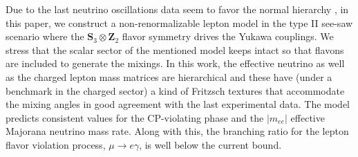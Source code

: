 \documentclass[aps,prd,groupaddress,floatfix,tighten,nofootinbib,showpacs,amsfonts,superscriptaddress]{revtex4-2}
\begin{document}
Due to the last neutrino oscillations data seem to favor the normal hierarchy \cite{deSalas:2020pgw}, in this paper, we construct a non-renormalizable lepton model in the type II see-saw scenario where the $\mathbf{S}_{3}\otimes \mathbf{Z}_{2}$ flavor symmetry  drives the Yukawa couplings. We stress that the scalar sector of the mentioned model keeps intact so that flavons are included to generate the mixings. In this work, the effective neutrino as well as  the charged lepton mass matrices are hierarchical and these have (under a benchmark in the charged sector) a kind of Fritzsch textures that accommodate the mixing angles in good agreement with the last experimental data. The model predicts  consistent values for the  CP-violating phase and the $\vert m_{ee}\vert$ effective Majorana neutrino mass rate. Along with this, the branching ratio for the lepton flavor violation process, $\mu\rightarrow e\gamma$, is well below the current bound.



	

\end{document}
